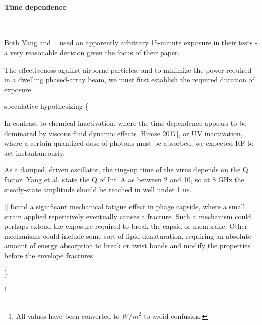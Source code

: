 \documentclass[fleqn,10pt]{article}
\begin{document}
\clearpage
\paragraph{\textbf{Time dependence}}\


Both Yang and [] used an apparently arbitrary 15-minute exposure in their tests - a very reasonable decision given the focus of their paper. 

The effectiveness against airborne particles, and to minimize the power required in a dwelling phased-array beam, we must first establish the required duration of exposure.

{\color{red} speculative hypothesizing \{ } 

In contrast to chemical inactivation, where the time dependence appears to be dominated by viscous fluid dynamic effects [Hirose 2017], or UV inactivation, where a certain quantized dose of photons must be absorbed, we expected RF to act instantaneously.

As a damped, driven oscillator, the ring-up time of the virus depends on the Q factor. Yang et al. state the Q of Inf. A as between 2 and 10, so at 8 GHz the steady-state amplitude should be reached in well under 1 us. 

[] found a significant mechanical fatigue effect in phage capsids, where a small strain applied repetitively eventually causes a fracture. Such a mechanism could perhaps extend the exposure required to break the capsid or membrane. Other mechanisms could include some sort of lipid denaturation, requiring an absolute amount of energy absorption to break or twist bonds and modify the properties before the envelope fractures.


{\color{red}  \} } 

\footnote{All values have been converted to $W/m^2$ to avoid confusion.}
\end{document}
